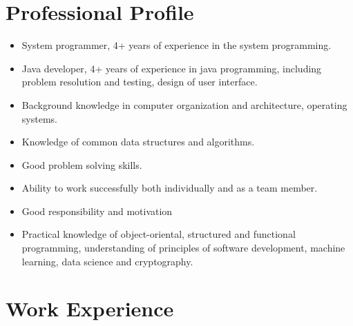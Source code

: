 \documentclass[a4paper,12pt]{article}
\begin{document}
\section{Professional Profile}

\begin{itemize}[label=\textcolor{blue}{\textbullet}]
    \rmfamily
    \setlength\itemsep{-2mm}
    \item System programmer, 4+ years of experience in the system programming.
    \item Java developer, 4+ years of experience in java programming, including problem resolution and testing, design of user interface.
    \item Background knowledge in computer organization and architecture, operating systems.
    \item Knowledge of common data structures and algorithms.
    \item Good problem solving skills.
    \item Ability to work successfully both individually and as a team member.
    \item Good responsibility and motivation
    \item Practical knowledge of object-oriental, structured and functional programming, understanding of principles of software development, machine learning, data science and cryptography.
    \normalfont
\end{itemize}

\section{Work Experience}
\end{document}
